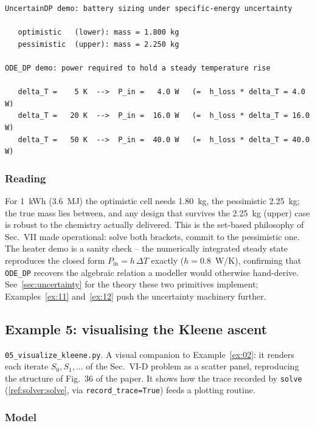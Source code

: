 \documentclass[11pt,a4paper]{article}
\begin{document}
\begin{lstlisting}[language={},numbers=none,keywordstyle={}]
UncertainDP demo: battery sizing under specific-energy uncertainty

   optimistic   (lower): mass = 1.800 kg
   pessimistic  (upper): mass = 2.250 kg

ODE_DP demo: power required to hold a steady temperature rise

   delta_T =    5 K  -->  P_in =   4.0 W   (=  h_loss * delta_T = 4.0 W)
   delta_T =   20 K  -->  P_in =  16.0 W   (=  h_loss * delta_T = 16.0 W)
   delta_T =   50 K  -->  P_in =  40.0 W   (=  h_loss * delta_T = 40.0 W)
\end{lstlisting}

\subsubsection*{Reading}

For 1~kWh ($3.6$~MJ) the optimistic cell needs 1.80~kg, the pessimistic
2.25~kg; the true mass lies between, and any design that survives the
2.25~kg (upper) case is robust to the chemistry actually delivered. This
is the set-based philosophy of Sec.~VII made operational: solve both
brackets, commit to the pessimistic one. The heater demo is a sanity
check -- the numerically integrated steady state reproduces the closed
form $P_{\text{in}}=h\,\Delta T$ exactly ($h=0.8$~W/K), confirming that
\texttt{ODE\_DP} recovers the algebraic relation a modeller would
otherwise hand-derive. See~\ref{sec:uncertainty} for the theory these two
primitives implement; Examples~\ref{ex:11} and~\ref{ex:12} push the
uncertainty machinery further.

\subsection{Example 5: visualising the Kleene ascent}\label{ex:05}

\texttt{05\_visualize\_kleene.py}. A visual companion to
Example~\ref{ex:02}: it renders each iterate $S_0, S_1, \ldots$ of the
Sec.\ VI-D problem as a scatter panel, reproducing the structure of
Fig.~36 of the paper. It shows how the trace recorded by \texttt{solve}
(\ref{ref:solver:solve}, via \texttt{record\_trace=True}) feeds a plotting
routine.

\subsubsection*{Model}
\end{document}
